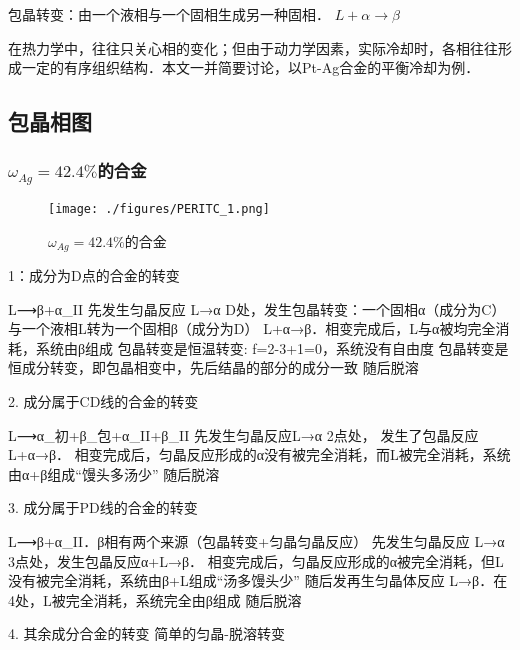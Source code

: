 包晶转变：由一个液相与一个固相生成另一种固相． $L + \alpha \rightarrow \beta$

在热力学中，往往只关心相的变化；但由于动力学因素，实际冷却时，各相往往形成一定的有序组织结构．本文一并简要讨论，以Pt-Ag合金的平衡冷却为例．

\subsection{包晶相图}
\subsubsection{$\omega_{Ag}=42.4\%$的合金}
\begin{figure}[ht]
\centering
\texttt{[image: ./figures/PERITC\_1.png]}
\caption{$\omega_{Ag}=42.4\%$的合金} \label{PERITC_fig1}
\end{figure}

1：成分为D点的合金的转变
	 
	L⟶β+α_II
	先发生匀晶反应 L→α
	D处，发生包晶转变：一个固相α（成分为C）与一个液相L转为一个固相β（成分为D） L+α→β．相变完成后，L与α被均完全消耗，系统由β组成
	包晶转变是恒温转变: f=2-3+1=0，系统没有自由度
	包晶转变是恒成分转变，即包晶相变中，先后结晶的部分的成分一致
	随后脱溶


2.  成分属于CD线的合金的转变
	 
	L⟶α_初+β_包+α_II+β_II
	先发生匀晶反应L→α
	2点处， 发生了包晶反应L+α→β．
	相变完成后，匀晶反应形成的α没有被完全消耗，而L被完全消耗，系统由α+β组成“馒头多汤少”
	随后脱溶

3.  成分属于PD线的合金的转变
	 
	L⟶β+α_II．β相有两个来源（包晶转变+匀晶匀晶反应）
	先发生匀晶反应 L→α
	3点处，发生包晶反应α+L→β．
	相变完成后，匀晶反应形成的α被完全消耗，但L没有被完全消耗，系统由β+L组成“汤多馒头少”
	随后发再生匀晶体反应 L→β．在4处，L被完全消耗，系统完全由β组成
	随后脱溶

4. 其余成分合金的转变
	简单的匀晶-脱溶转变
